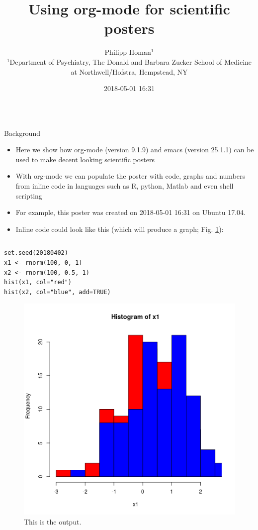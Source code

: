 \documentclass[final]{beamer}
\date{}
\author{
Philipp Homan$^{1}$
\\
\vspace{5mm}
\normalsize{$^{1}$Department of Psychiatry,}
\normalsize{The Donald and Barbara Zucker}
\normalsize{School of Medicine at Northwell/Hofstra,}
\normalsize{Hempstead, NY}
}
\date{2018-05-01 16:31}
\title{Using org-mode for scientific posters}
\begin{document}
\begin{frame}[fragile,label={sec:org48aedac}]{}
 \begin{columns}
\begin{column}[t]{0.45\columnwidth}
\begin{block}{Background}
\begin{itemize}
\item Here we show how org-mode (version 
9.1.9) and emacs (version 
25.1.1) can be used to make decent looking scientific
posters
\item With org-mode we can populate the poster with code, graphs and numbers
from inline code in languages such as R, python, Matlab and even shell
scripting
\item For example, this poster was created on 2018-05-01 16:31 on
Ubuntu 17.04.
\item Inline code could look like this (which will produce a graph; 
Fig. \ref{fig:orgf02b88f}):
\end{itemize}

\begin{columns}
\begin{column}[T]{0.68\columnwidth}
\begin{verbatim}
set.seed(20180402)
x1 <- rnorm(100, 0, 1)
x2 <- rnorm(100, 0.5, 1)
hist(x1, col="red")
hist(x2, col="blue", add=TRUE)
\end{verbatim}

\begin{figure}[htbp]
\centering
\includegraphics[width=.9\linewidth]{3.png}
\caption{\label{fig:orgf02b88f}
This is the output.}
\end{figure}
\end{column}
\end{columns}
\end{block}


\end{column}
\end{columns}
\end{frame}
\end{document}

